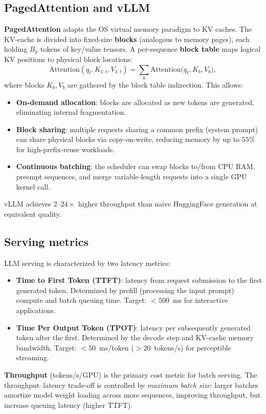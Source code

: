 \documentclass[11pt,a4paper]{article}
\begin{document}
	\subsection{PagedAttention and vLLM}

	\textbf{PagedAttention} \parencite{kwon2023vllm} adapts the OS virtual memory paradigm to KV caches. The KV-cache is divided into fixed-size \textbf{blocks} (analogous to memory pages), each holding $B_k$ tokens of key/value tensors. A per-sequence \textbf{block table} maps logical KV positions to physical block locations:
	\begin{equation}
		\mathrm{Attention}(q_t, K_{1:t}, V_{1:t}) = \sum_{b} \mathrm{Attention}\!\bigl(q_t, K_b, V_b\bigr),
	\end{equation}
	where blocks $K_b, V_b$ are gathered by the block table indirection. This allows:
	\begin{itemize}[nosep]
		\item \textbf{On-demand allocation}: blocks are allocated as new tokens are generated, eliminating internal fragmentation.
		\item \textbf{Block sharing}: multiple requests sharing a common prefix (system prompt) can share physical blocks via copy-on-write, reducing memory by up to $55\%$ for high-prefix-reuse workloads.
		\item \textbf{Continuous batching}: the scheduler can swap blocks to/from CPU RAM, preempt sequences, and merge variable-length requests into a single GPU kernel call.
	\end{itemize}
	vLLM achieves $2$--$24\times$ higher throughput than naive HuggingFace generation at equivalent quality.

	\subsection{Serving metrics}

	LLM serving is characterized by two latency metrics:
	\begin{itemize}[nosep]
		\item \textbf{Time to First Token (TTFT)}: latency from request submission to the first generated token. Determined by prefill (processing the input prompt) compute and batch queuing time. Target: $<500$~ms for interactive applications.
		\item \textbf{Time Per Output Token (TPOT)}: latency per subsequently generated token after the first. Determined by the decode step and KV-cache memory bandwidth. Target: $<50$~ms/token ($>20$~tokens/s) for perceptible streaming.
	\end{itemize}
	\textbf{Throughput} (tokens/s/GPU) is the primary cost metric for batch serving. The throughput--latency trade-off is controlled by \emph{maximum batch size}: larger batches amortize model weight loading across more sequences, improving throughput, but increase queuing latency (higher TTFT).
\end{document}
